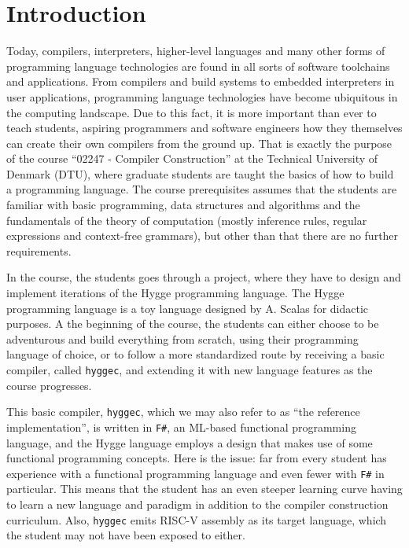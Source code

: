 \chapter{Introduction}

Today, compilers, interpreters, higher-level languages and many other forms of programming language technologies are found
in all sorts of software toolchains and applications. From compilers and build systems to embedded interpreters in user
applications, programming language technologies have become ubiquitous in the computing landscape. Due to this fact, it is
more important than ever to teach students, aspiring programmers and software engineers how they themselves
can create their own compilers from the ground up. That is exactly the purpose of the course ``02247 - Compiler Construction''\cite{curriculum_02247}
at the Technical University of Denmark (DTU), where graduate students are taught the basics of how to build a programming language.
The course prerequisites assumes that the students are familiar with basic programming, data structures and algorithms and
the fundamentals of the theory of computation (mostly inference rules, regular expressions and context-free grammars), but
other than that there are no further requirements.

In the course, the students goes through a project, where they have to design and implement iterations of the Hygge programming language.
The Hygge programming language is a toy language designed by A. Scalas for didactic purposes. A the beginning of the course,
the students can either choose to be adventurous and build everything from scratch, using their programming language of choice,
or to follow a more standardized route by receiving a basic compiler, called \texttt{hyggec}\cite{hyggec}, and extending it with new
language features as the course progresses.

This basic compiler, \texttt{hyggec}, which we may also refer to as ``the reference implementation'', is written in \texttt{F\#},
an ML-based functional programming language, and the Hygge language employs a design that makes use of some functional programming concepts.
Here is the issue: far from every student has experience with a functional programming language and even fewer with \texttt{F\#}
in particular. This means that the student has an even steeper learning curve having to learn a new language and paradigm
in addition to the compiler construction curriculum. Also, \texttt{hyggec} emits RISC-V assembly as its target language\cite{lecture_notes},
which the student may not have been exposed to either.

